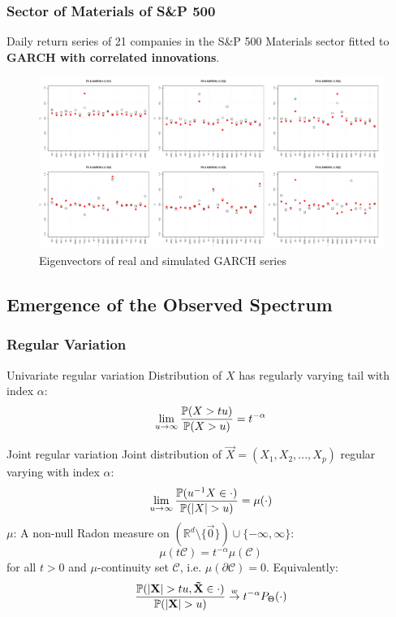 \documentclass{beamer}
\begin{document}
\begin{frame}
  \frametitle{Sector of Materials of S\&P 500}
  Daily return series of 21 companies in the S\&P 500 Materials sector
  fitted to {\bf GARCH with correlated innovations}.
  \begin{figure}[htb!]
    \centering
    \includegraphics[width=1.0\linewidth]{Materials_eigenvectors1.pdf}
    \caption{\scriptsize Eigenvectors of real and simulated GARCH series}
  \end{figure}
\end{frame}

\subsection{Emergence of the Observed Spectrum}
\begin{frame}
  \frametitle{Regular Variation}
  \begin{minipage}[t]{0.4\linewidth}
    \textcolor[HTML]{990033}{Univariate regular variation}
    Distribution of $X$ has regularly varying tail with index $\alpha$:
    \[
    \lim_{u \to \infty}
    {
      \P(X > t u)
      \over
      \P(X > u)
    } = t^{-\alpha}
    \]
  \end{minipage}\hfill
  \begin{minipage}[t]{0.55\linewidth}
    \textcolor[HTML]{990033}{Joint regular variation}    
    Joint distribution of $\vec X = (X_1, X_2, ..., X_p)$ regular varying with
    index $\alpha$:
    \[
    \lim_{u \to \infty}
    {
      \P(u^{-1} X \in \cdot)
      \over
      \P(|X|>u)
    } = \mu(\cdot)
    \]
    $\mu$: A non-null Radon measure on $(\mathbb R^d \setminus \{\vec
    0\}) \cup \{-\infty, \infty\}$:
    \[
      \mu(t \mathcal C) =
      t^{-\alpha} \mu(\mathcal C)
    \]
    for all $t > 0$ and $\mu$-continuity set $\mathcal C$,
    i.e. $\mu(\partial \mathcal C) = 0$. Equivalently:
    \[
    {
      \P(|\vec X| > t u, \vec{\tilde X} \in \cdot)
      \over
      \P(|\vec X| > u)
    } \overset{w}{\to} t^{-\alpha} P_\Theta(\cdot)
    \]
  \end{minipage}
\end{frame}
\end{document}

